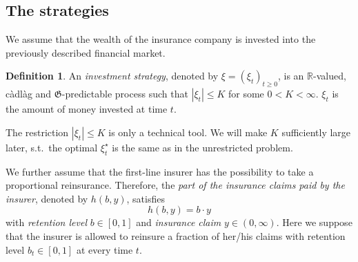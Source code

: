 \documentclass[reqno, 11pt]{amsart}%
\newcommand{\R}{\mathbb{R}}
\theoremstyle{definition}
\newtheorem{definition}[theorem]{Definition}
\numberwithin{equation}{section} \numberwithin{theorem}{section}
\begin{document}
\subsection{The strategies}
We assume that the wealth of the insurance company is invested into the previously described financial market. 
\begin{definition}\label{def:investment}
	An \emph{investment strategy}, denoted by $\xi=(\xi_t)_{t\ge0}$, is an $\R$-valued, c\`{a}dl\`{a}g and ${\mathfrak G}$-predictable process such that $| \xi_t|\le K$ for some $0<K<\infty$. $\xi_t$ is the amount of money invested at time $t$.
\end{definition}

The restriction  $| \xi_t|\le K$ is only a technical tool. We will make $K$ sufficiently large later, s.t.\ the optimal $\xi_t^\star$ is the same as in the unrestricted problem.

We further assume that the first-line insurer has the possibility to take a proportional reinsurance. Therefore, the \emph{part of the insurance claims paid by the insurer}, denoted by $h(b,y)$, satisfies
\begin{equation*}
h(b,y) = b\cdot y
\end{equation*}
with \emph{retention level} $b\in[0,1]$ and \emph{insurance claim} $y\in(0,\infty)$. Here we suppose that the insurer is allowed to reinsure a fraction of her/his claims with retention level $b_t\in[0,1]$ at every time $t$. 
\end{document}
